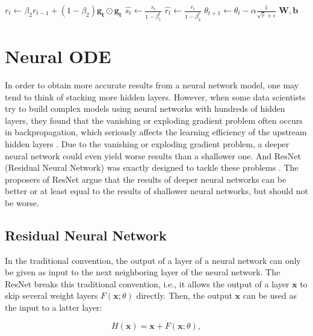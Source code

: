 \documentclass[
	parskip, 			   %
	twoside, 			   %
	DIV=14, 			   %
	BCOR=15.0mm, 		   %
	headsepline, 		   %
	open=right, 		   %
	captions=tableheading, %
	bibliography=totoc,    %
	numbers=noenddot       %
]{scrreprt}
\begin{document}
\begin{algorithm}[h!]
\begin{algorithmic}
    \State $r_t \gets \beta_2 r_{t-1} + (1-\beta_2) \mathbf{g_t} \odot \mathbf{g_t}$ 
    \State {}
    \State $\hat{s_t} \gets \frac{s_t}{1-\beta_1^t}$ 
    \State $\hat{r_t} \gets \frac{r_t}{1-\beta_2^t}$ 
    \State {}
    \State $\theta_{t+1} \gets \theta_{t} - \alpha \frac{\hat{s}}{\sqrt{\hat{r}} + \epsilon}$ 
    \State {}
    \EndWhile
    \State \Return $\mathbf{W}, \mathbf{b}$ 
    \end{algorithmic}
\end{algorithm}


\clearpage
\chapter{Neural ODE}
\label{ch:chapter5}
In order to obtain more accurate results from a neural network model, one may tend to think of stacking more hidden layers. However, when some data scientists try to build complex models using neural networks with hundreds of hidden layers, they found that the vanishing or exploding gradient problem often occurs in backpropagation, which seriously affects the learning efficiency of the upstream hidden layers \cite{glorot2010understanding}. Due to the vanishing or exploding gradient problem, a deeper neural network could even yield worse results than a shallower one. And ResNet (Residual Neural Network) was exactly designed to tackle these problems \cite{he2016deep}. The proposers of ResNet argue that the results of deeper neural networks can be better or at least equal to the results of shallower neural networks, but should not be worse.

\section{Residual Neural Network}
In the traditional convention, the output of a layer of a neural network can only be given as input to the next neighboring layer of the neural network. The ResNet breaks this traditional convention, i.e., it allows the output of a layer $\mathbf{x}$ to skip several weight layers $F(\mathbf{x};\theta)$ directly. Then, the output $\mathbf{x}$ can be used as the input to a latter layer:

\begin{equation}
    \label{eq:ResNet}
    H(\mathbf{x})=\mathbf{x}+F(\mathbf{x};\theta),
\end{equation}
\end{document}
